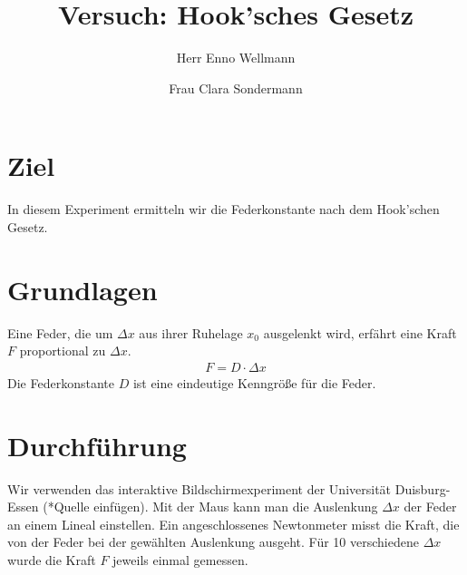 

\author{Herr Enno Wellmann \and Frau Clara Sondermann} %
\title{Versuch: Hook'sches Gesetz}


\maketitle

\section[short]{Ziel}
In diesem Experiment ermitteln wir die Federkonstante nach dem Hook'schen Gesetz.

\section{Grundlagen}
Eine Feder, die um $ \Delta x $ aus ihrer Ruhelage $ x_0 $ ausgelenkt wird, erfährt eine Kraft $ F $ 
proportional zu $ \Delta x $.
\begin{align}
    F = D \cdot \Delta x
\end{align}
Die Federkonstante $ D $ ist eine eindeutige Kenngröße für die Feder.

\section{Durchführung}
Wir verwenden das interaktive Bildschirmexperiment der Universität Duisburg-Essen (*Quelle einfügen).
Mit der Maus kann man die Auslenkung $ \Delta x $ der Feder an einem Lineal einstellen. 
Ein angeschlossenes Newtonmeter misst die Kraft, die von der Feder bei der gewählten Auslenkung ausgeht.
Für 10 verschiedene $ \Delta x $ wurde die Kraft $ F $ jeweils einmal gemessen.
